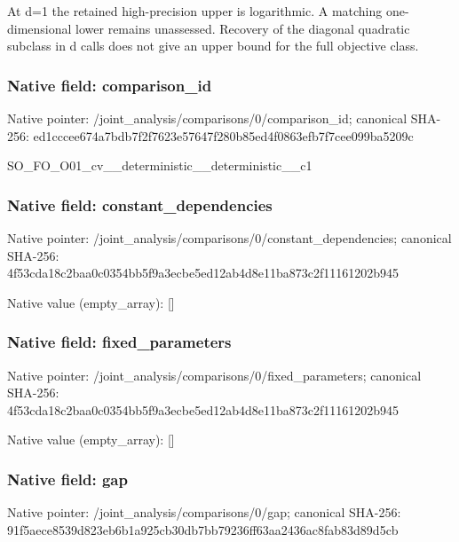 \documentclass[10pt,a4paper]{article}
\begin{document}
\begingroup\raggedright\sloppy At d=\allowbreak{}1 the retained high-precision upper is logarithmic. A matching one-dimensional lower remains unassessed. Recovery of the diagonal quadratic subclass in d calls does not give an upper bound for the full objective class.\par\endgroup

\subsubsection{Native field: comparison\_\allowbreak{}id}
Native pointer: /joint\_\allowbreak{}analysis/comparisons/0/comparison\_\allowbreak{}id; canonical SHA-256: ed1cccee674a7bdb7f2f7623e57647f280b85ed4f0863efb7f7cee099ba5209c

\begingroup\raggedright\sloppy SO\_\allowbreak{}FO\_\allowbreak{}O01\_\allowbreak{}cv\_\allowbreak{}\_\allowbreak{}deterministic\_\allowbreak{}\_\allowbreak{}deterministic\_\allowbreak{}\_\allowbreak{}c1\par\endgroup

\subsubsection{Native field: constant\_\allowbreak{}dependencies}
Native pointer: /joint\_\allowbreak{}analysis/comparisons/0/constant\_\allowbreak{}dependencies; canonical SHA-256: 4f53cda18c2baa0c0354bb5f9a3ecbe5ed12ab4d8e11ba873c2f11161202b945

Native value (empty\_\allowbreak{}array): []

\subsubsection{Native field: fixed\_\allowbreak{}parameters}
Native pointer: /joint\_\allowbreak{}analysis/comparisons/0/fixed\_\allowbreak{}parameters; canonical SHA-256: 4f53cda18c2baa0c0354bb5f9a3ecbe5ed12ab4d8e11ba873c2f11161202b945

Native value (empty\_\allowbreak{}array): []

\subsubsection{Native field: gap}
Native pointer: /joint\_\allowbreak{}analysis/comparisons/0/gap; canonical SHA-256: 91f5aece8539d823eb6b1a925cb30db7bb79236ff63aa2436ac8fab83d89d5cb
\end{document}
